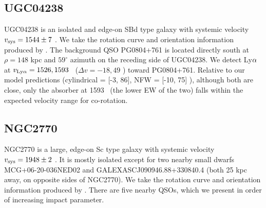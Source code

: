 



\subsection{UGC04238} \label{UGC04238}
UGC04238 is an isolated and edge-on SBd type galaxy with systemic velocity $v_{\rm sys} = 1544 \pm 7$ \kms. We take the rotation curve and orientation information produced by \cite{cote2005}. The background QSO PG0804+761 is located directly south at $\rho = 148$ kpc and $59^{\circ}$ azimuth on the receding side of UGC04238. We detect Ly$\rm \alpha$ at $v_{\rm Ly\alpha} = 1526, 1593$ \kms~($\Delta v = -18, 49$ \kms) toward PG0804+761. Relative to our model predictions (cylindrical = [-3, 86], NFW = [-10, 75] \kms), although both are close, only the absorber at 1593 \kms~(the lower EW of the two) falls within the expected velocity range for co-rotation.





\subsection{NGC2770}
NGC2770 is a large, edge-on Sc type galaxy with systemic velocity $v_{\rm sys} = 1948 \pm 2$ \kms. It is mostly isolated except for two nearby small dwarfs MCG+06-20-036NED02 and GALEXASCJ090946.88+330840.4 (both 25 kpc away, on opposite sides of NGC2770). We take the rotation curve and orientation information produced by \cite{rhee1996}.  There are five nearby QSOs, which we present in order of increasing impact parameter. 


